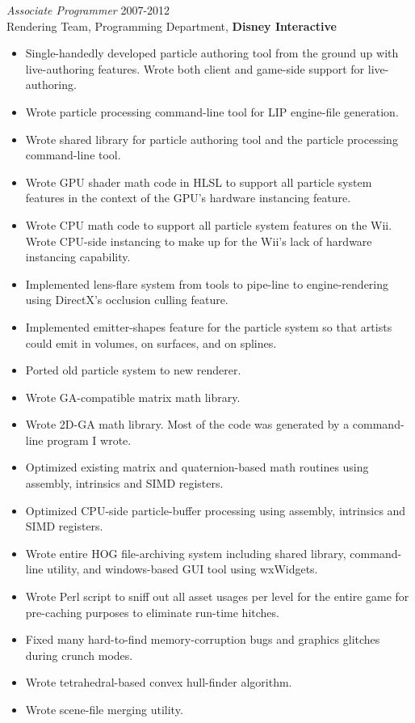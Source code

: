 \documentclass[margin]{res}
\begin{document}
\begin{resume}
                {\sl Associate Programmer} \hfill 2007-2012 \\
		Rendering Team, Programming Department, {\bf Disney Interactive}
                 \begin{itemize}  \itemsep -2pt %
		\item Single-handedly developed particle authoring tool from the ground up with live-authoring features.  Wrote both client and game-side support for live-authoring.
		\item Wrote particle processing command-line tool for LIP engine-file generation.
		\item Wrote shared library for particle authoring tool and the particle processing command-line tool.
		\item Wrote GPU shader math code in HLSL to support all particle system features in the context of the GPU's hardware instancing feature.
		\item Wrote CPU math code to support all particle system features on the Wii.  Wrote CPU-side instancing to make up for the Wii's lack of hardware instancing capability.
		\item Implemented lens-flare system from tools to pipe-line to engine-rendering using DirectX's occlusion culling feature.
		\item Implemented emitter-shapes feature for the particle system so that artists could emit in volumes, on surfaces, and on splines.
		\item Ported old particle system to new renderer.
		\item Wrote GA-compatible matrix math library.
		\item Wrote 2D-GA math library.  Most of the code was generated by a command-line program I wrote.
		\item Optimized existing matrix and quaternion-based math routines using assembly, intrinsics and SIMD registers.
		\item Optimized CPU-side particle-buffer processing using assembly, intrinsics and SIMD registers.
		\item Wrote entire HOG file-archiving system including shared library, command-line utility, and windows-based GUI tool using wxWidgets.
		\item Wrote Perl script to sniff out all asset usages per level for the entire game for pre-caching purposes to eliminate run-time hitches.
		\item Fixed many hard-to-find memory-corruption bugs and graphics glitches during crunch modes.
		\item Wrote tetrahedral-based convex hull-finder algorithm.
		\item Wrote scene-file merging utility.
                 \end{itemize} 


\end{resume}
\end{document}
